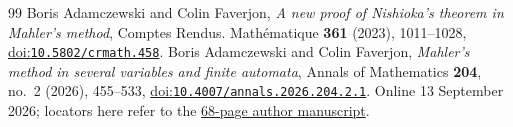 \begin{thebibliography}{99}
 Boris Adamczewski and Colin Faverjon,
  \emph{A new proof of Nishioka's theorem in Mahler's method},
  Comptes Rendus. Math\'ematique \textbf{361} (2023), 1011--1028,
  \href{https://doi.org/10.5802/crmath.458}{doi:\nolinkurl{10.5802/crmath.458}}.
 Boris Adamczewski and Colin Faverjon,
  \emph{Mahler's method in several variables and finite automata},
  Annals of Mathematics \textbf{204}, no.~2 (2026), 455--533,
  \href{https://doi.org/10.4007/annals.2026.204.2.1}{doi:\nolinkurl{10.4007/annals.2026.204.2.1}}.
  Online 13 September 2026; locators here refer to the
  \href{https://faverjon.perso.math.cnrs.fr/AdamczewskiFaverjon_MahlerFiniteAutomata.pdf}{68-page author manuscript}.
\end{thebibliography}


